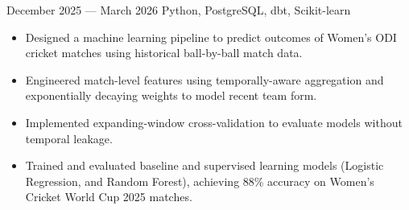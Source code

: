 
{December 2025 --- March 2026}
{Python, PostgreSQL, dbt, Scikit-learn}
  \begin{itemize}
    \item Designed a machine learning pipeline to predict outcomes of Women’s ODI cricket matches using historical ball-by-ball match data.
    \item Engineered match-level features using temporally-aware aggregation and exponentially decaying weights to model recent team form.
    \item Implemented expanding-window cross-validation to evaluate models without temporal leakage.
    \item Trained and evaluated baseline and supervised learning models (Logistic Regression, and Random Forest), achieving 88\% accuracy on Women’s Cricket World Cup 2025 matches.
  \end{itemize}
